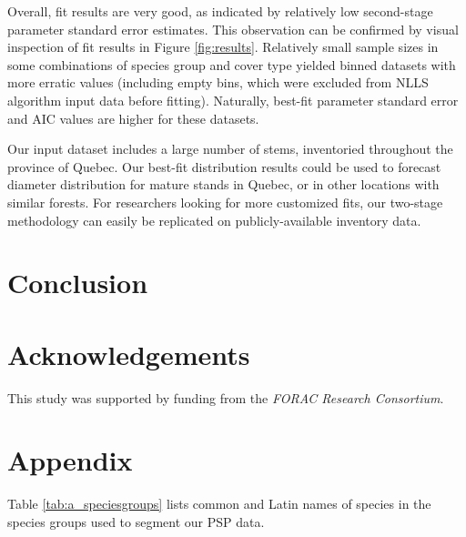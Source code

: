 \message{ !name(pspdistfit_article.tex)}\documentclass{article}
\begin{document}
Overall, fit results are very good, as indicated by relatively low second-stage parameter standard error estimates.
This observation can be confirmed by visual inspection of fit results in Figure \ref{fig:results}.
Relatively small sample sizes in some combinations of species group and cover type yielded binned datasets with more erratic values (including empty bins, which were excluded from NLLS algorithm input data before fitting).
Naturally, best-fit parameter standard error and AIC values are higher for these datasets. 

Our input dataset includes a large number of stems, inventoried throughout the province of Quebec.
Our best-fit distribution results could be used to forecast diameter distribution for mature stands in Quebec, or in other locations with similar forests.
For researchers looking for more customized fits, our two-stage methodology can easily be replicated on publicly-available inventory data.

\section{Conclusion}
\label{sec:conclusion}



\section{Acknowledgements}

This study was supported by funding from the \emph{FORAC Research Consortium}.

\begin{nolinenumbers}


\end{nolinenumbers}

\section*{Appendix}

Table \ref{tab:a_speciesgroups} lists common and Latin names of species in the species groups used to segment our PSP data.
\end{document}
